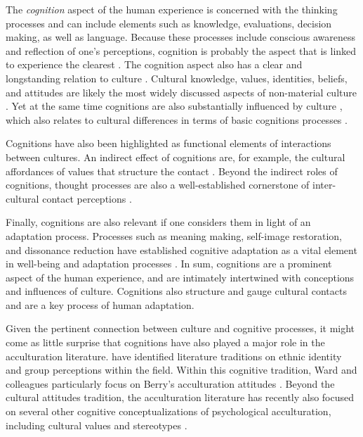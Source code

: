 \documentclass[nobib]{tufte-handout}
\begin{document}
The \textit{cognition} aspect of the human experience is concerned with the thinking processes and can include elements such as knowledge, evaluations, decision making, as well as language. Because these processes include conscious awareness and reflection of one's perceptions, cognition is probably the aspect that is linked to experience the clearest \citep{Jacobs1998}. The cognition aspect also has a clear and longstanding relation to culture . Cultural knowledge, values, identities, beliefs, and attitudes are likely the most widely discussed aspects of non-material culture \citep[e.g.,][]{DiMaggio1997}. Yet at the same time cognitions are also substantially influenced by culture \citep[e.g., through social norms][]{Gelfand2011}, which also relates to cultural differences in terms of basic cognitions processes \citep{Nisbett2002}.

Cognitions have also been highlighted as functional elements of interactions between cultures. An indirect effect of cognitions are, for example, the cultural affordances of values that structure the contact \citep[e.g.,][]{Ramstead2016}. Beyond the indirect roles of cognitions, thought processes are also a well-established cornerstone of inter-cultural contact perceptions \citep[e.g., out-group attitudes;][]{Stephan2000a}.

Finally, cognitions are also relevant if one considers them in light of an adaptation process. Processes such as meaning making, self-image restoration, and dissonance reduction have established cognitive adaptation as a vital element in well-being and adaptation processes \citep[e.g.,][]{Czajkowska2017}. In sum, cognitions are a prominent aspect of the human experience, and are intimately intertwined with conceptions and influences of culture. Cognitions also structure and gauge cultural contacts and are a key process of human adaptation.

Given the pertinent connection between culture and cognitive processes, it might come as little surprise that cognitions have also played a major role in the acculturation literature. \citet{Ward2001} have identified literature traditions on ethnic identity and group perceptions within the field. Within this cognitive tradition, Ward and colleagues particularly focus on Berry's \citeyear{Berry1997b} acculturation attitudes \citep{Ward2019}. Beyond the cultural attitudes tradition, the acculturation literature has recently also focused on several other cognitive conceptualizations of psychological acculturation, including cultural values \citep[e.g.,]{Marin2003} and stereotypes \citep[e.g.,][]{Stanciu2018}. 
\end{document}
